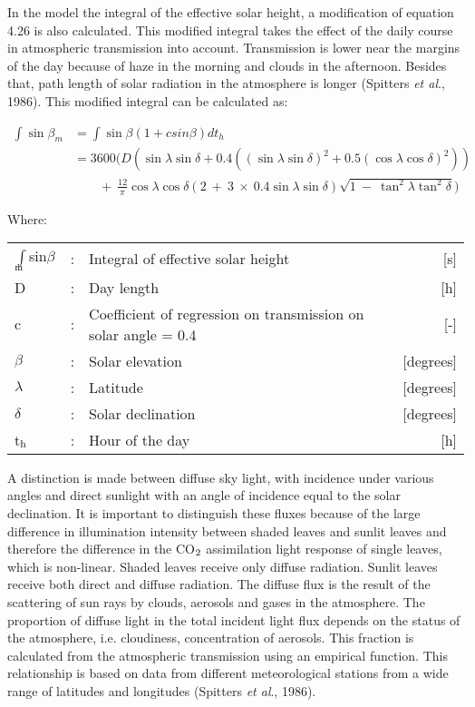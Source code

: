\documentclass[11pt]{report}
\begin{document}
In the model the integral of the effective solar height, a modification of equation 4.26 is
also calculated. This modified integral takes the effect of the daily course in atmos\-pheric
transmis\-sion into account. Transmission is lower near the margins of the day because of
haze in the morning and clouds in the afternoon. Besides that, path length of solar
radiation in the atmosphere is longer (Spitters {\it et al\/}., 1986). This modified integral can be calculated as:

\begin{align}
\int \sin \beta_{m} &= \int \sin \beta (1+csin \beta ) dt _{h}  \\
                    &=3600(D ( \sin \lambda \sin \delta + 0.4 
                      (( \sin \lambda \sin \delta )^{2} + 0.5( 
                      \cos \lambda \cos \delta ) ^{2} ))  \nonumber \\
                      &\qquad {} +~{\frac{12}{\pi }} \cos \lambda \cos 
                      \delta (2~+~3 ~\times ~ 0.4 \sin \lambda \sin \delta ) 
                      \sqrt{1~-~\tan^{2} \lambda \tan^{2} \delta } ) \nonumber
\end{align}


Where:\\
\begin{tabularx}{\textwidth}{llXr}
$\int$sin$\beta$$_{{\rm m}}$  &:& Integral of effective solar height       & [s]\\
D  &:& Day length       & [h]\\
c  &:& Coefficient of regression on transmission on solar angle = 0.4       & [-]\\
$\beta$  &:& Solar elevation        & [degrees]\\
$\lambda$  &:& Latitude       & [degrees]\\
$\delta$  &:& Solar declination       & [degrees]\\
t$_{{\rm h}}$  &:& Hour of the day       & [h]\\
\end{tabularx}

A distinction is made between diffuse sky light, with incidence under various angles and
direct sunlight with an angle of incidence equal to the solar declination. It is important to distin\-guish these fluxes because of the large difference in illumination intensity between shaded leaves and sunlit leaves and therefore the difference in the CO$_{{\rm 2}}$ assimila\-tion light response of single leaves, which is non-linear. Shaded leaves receive only diffuse radiation. Sunlit leaves receive both direct and diffuse radiation. The diffuse flux is the result of the scattering of sun rays by clouds, aerosols and gases in the atmo\-sphere. The propor\-tion of diffuse light in the total incident light flux depends on the status of the atmosphere, i.e. cloudi\-ness, concentra\-tion of aerosols. This fraction is calculated from the atmospheric transmis\-sion using an empirical function. This relationship is based on data from different meteorologi\-cal stations from a wide range of latitudes and longitudes (Spitters {\it et al\/}., 1986). 
\end{document}
